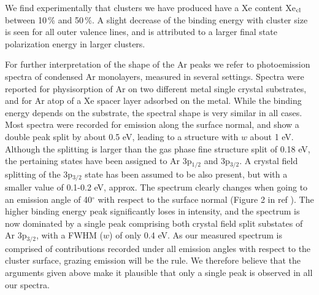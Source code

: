 \documentclass[journal=jpccck,manuscript=article]{achemso}
\begin{document}
We find experimentally that clusters we have produced have a Xe content Xe$_{\rm cl}$ between 10\,\% and 50\,\%.
A slight decrease of the binding energy with cluster size is seen for all outer valence lines, and is attributed to a larger final state polarization energy in larger clusters. 

For further interpretation of the shape of the Ar peaks we refer to photoemission spectra of condensed Ar monolayers, measured in several settings.\cite{jacobi,jacobi2}
Spectra were reported for physisorption of Ar on two different metal single crystal substrates, and for Ar atop of a Xe spacer layer adsorbed on the metal.
While the binding energy depends on the substrate, the spectral shape is very similar in all cases. 
Most spectra were recorded for emission along the surface normal, and show a double peak split by about 0.5 eV, leading to a structure with $w$ about 1 eV.
Although the splitting is larger than the gas phase fine structure split of 0.18 eV, the pertaining states have been assigned to Ar 3p$_{1/2}$ and 3p$_{3/2}$.
A crystal field splitting of the 3p$_{3/2}$ state has been assumed to be also present, but with a smaller value of 0.1-0.2 eV, approx.\cite{jacobi2} 
The spectrum clearly changes when going to an emission angle of 40$^\circ$ with respect to the surface normal (Figure 2 in ref ).
The higher binding energy peak significantly loses in intensity, and the spectrum is now dominated by a single peak comprising both crystal field split substates of Ar 3p$_{3/2}$, with a FWHM ($w$) of only 0.4 eV.
As our measured spectrum is comprised of contributions recorded under all emission angles with respect to the cluster surface, grazing emission will be the rule.
We therefore believe that the arguments given above make it plausible that only a single peak is observed in all our spectra.
\end{document}
